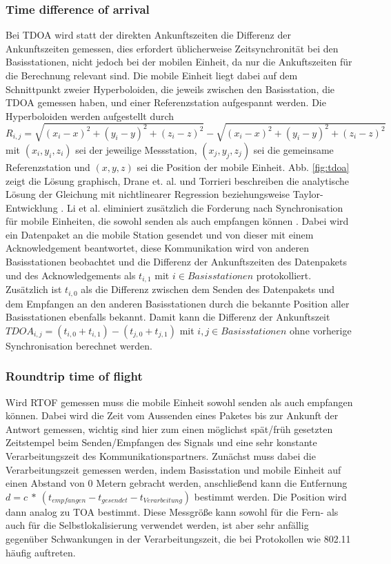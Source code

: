 \subsubsection{Time difference of arrival}
Bei TDOA wird statt der direkten Ankunftszeiten die Differenz der Ankunftszeiten gemessen, dies erfordert üblicherweise Zeitsynchronität bei den Basisstationen, nicht jedoch bei der mobilen Einheit, da nur die Ankuftszeiten für die Berechnung relevant sind. Die mobile Einheit liegt dabei auf dem Schnittpunkt zweier Hyperboloiden, die jeweils zwischen den Basisstation, die TDOA gemessen haben, und einer Referenzstation aufgespannt werden. 
Die Hyperboloiden werden aufgestellt durch \\
$R_{i,j} = \sqrt{(x_i - x)^2 + (y_i - y)^2 + (z_i - z)^2} - \sqrt{(x_i - x)^2 + (y_i - y)^2 + (z_i - z)^2}$ mit $(x_i,y_i,z_i)$ sei der jeweilige Messstation, $(x_j,y_j,z_j)$ sei die gemeinsame Referenzstation und $(x,y,z)$ sei die Position der mobile Einheit. %
Abb. \ref{fig:tdoa} zeigt die Lösung graphisch, Drane et. al. und Torrieri beschreiben die analytische Lösung der Gleichung mit nichtlinearer Regression \cite{drane1998positioning} beziehungsweise Taylor-Entwicklung \cite{torrieri1984statistical}. 
Li et al. eliminiert zusätzlich die Forderung nach Synchronisation für mobile Einheiten, die sowohl senden als auch empfangen können \cite{li2000comparison}. 
Dabei wird ein Datenpaket an die mobile Station gesendet und von dieser mit einem Acknowledgement beantwortet, diese Kommunikation wird von anderen Basisstationen beobachtet und die Differenz der Ankunftszeiten des Datenpakets und des Acknowledgements als $t_{i,1}$ mit $i \in Basisstationen$ protokolliert. Zusätzlich ist $t_{i,0}$ als die Differenz zwischen dem Senden des Datenpakets und dem Empfangen an den anderen Basisstationen durch die bekannte Position aller Basisstationen ebenfalls bekannt. Damit kann die Differenz der Ankunftszeit $TDOA_{i,j} = (t_{i,0} + t_{i,1}) - (t_{j,0} + t_{j,1})$ mit $i,j \in Basisstationen$ ohne vorherige Synchronisation berechnet werden. \\


\subsubsection{Roundtrip time of flight}
Wird RTOF gemessen muss die mobile Einheit sowohl senden als auch empfangen können. Dabei wird die Zeit vom Aussenden eines Paketes bis zur Ankunft der Antwort gemessen, wichtig sind hier zum einen möglichst spät/früh gesetzten Zeitstempel beim Senden/Empfangen des Signals und eine sehr konstante Verarbeitungszeit des Kommunikationspartners. Zunächst muss dabei die Verarbeitungszeit gemessen werden, indem Basisstation und mobile Einheit auf einen Abstand von 0 Metern gebracht werden, anschließend kann die Entfernung $d = c\ *\ (t_{empfangen} - t_{gesendet} - t_{Verarbeitung})$ bestimmt werden. Die Position wird dann analog zu TOA bestimmt. Diese Messgröße kann sowohl für die Fern- als auch für die Selbstlokalisierung verwendet werden, ist aber sehr anfällig gegenüber Schwankungen in der Verarbeitungszeit, die bei Protokollen wie 802.11 häufig auftreten. \\

